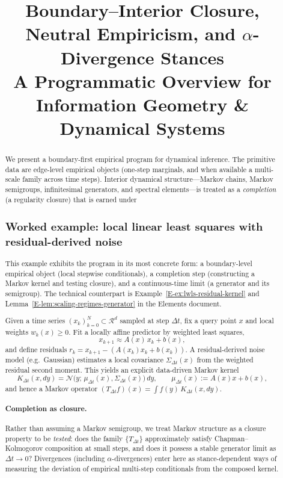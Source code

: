 \documentclass[11pt]{article}
\title{Boundary--Interior Closure, Neutral Empiricism, and $\alpha$-Divergence Stances\\
\large A Programmatic Overview for Information Geometry \& Dynamical Systems}
\author{}
\date{}
\providecommand{\Eref}[1]{\ref{E-#1}}
\newcommand{\R}{\mathcal{R}}
\begin{document}
\maketitle

\begin{abstract}
We present a boundary-first empirical program for dynamical inference. The primitive data are
edge-level empirical objects (one-step marginals, and when available a multi-scale family across
time steps). Interior dynamical structure---Markov chains, Markov semigroups, infinitesimal generators,
and spectral elements---is treated as a \emph{completion} (a regularity closure) that is earned under

\subsection{Worked example: local linear least squares with residual-derived noise}
\label{subsec:worked-example-lwls}

This example exhibits the program in its most concrete form: a
boundary-level empirical object (local stepwise conditionals), a
completion step (constructing a Markov kernel and testing closure), and
a continuous-time limit (a generator and its semigroup). The technical
counterpart is Example~\Eref{ex:lwls-residual-kernel} and
Lemma~\Eref{lem:scaling-regimes-generator} in the Elements document.

Given a time series $(x_k)_{k=0}^{N}\subset\R^d$ sampled at step
$\Delta t$, fix a query point $x$ and local weights $w_k(x)\ge 0$. Fit a
locally affine predictor by weighted least squares,
\[
  x_{k+1}\approx A(x)\,x_k + b(x),
\]
and define residuals $r_k=x_{k+1}-(A(x_k)x_k+b(x_k))$. A residual-derived
noise model (e.g.\ Gaussian) estimates a local covariance $\Sigma_{\Delta
t}(x)$ from the weighted residual second moment. This yields an explicit
data-driven Markov kernel
\[
  K_{\Delta t}(x,dy)=\mathcal N\!\bigl(y;\,\mu_{\Delta t}(x),\Sigma_{\Delta t}(x)\bigr)\,dy,
  \qquad \mu_{\Delta t}(x):=A(x)x+b(x),
\]
and hence a Markov operator $(T_{\Delta t}f)(x)=\int f(y)\,K_{\Delta t}(x,dy)$.

\paragraph{Completion as closure.}
Rather than assuming a Markov semigroup, we treat Markov structure as a
closure property to be \emph{tested}: does the family
$\{T_{\Delta t}\}$ approximately satisfy Chapman--Kolmogorov
composition at small steps, and does it possess a stable generator
limit as $\Delta t\to 0$? Divergences (including $\alpha$-divergences)
enter here as stance-dependent ways of measuring the deviation of
empirical multi-step conditionals from the composed kernel.


\end{abstract}
\end{document}
